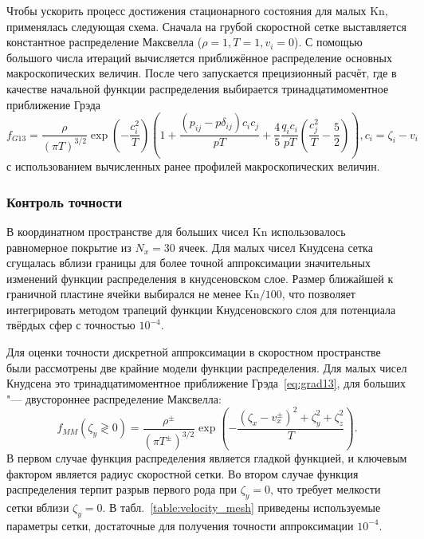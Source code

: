 \documentclass[a4paper,12pt]{article}
\newcommand{\Kn}{\mathrm{Kn}}
\begin{document}
Чтобы ускорить процесс достижения стационарного состояния для малых \(\Kn\), применялась следующая схема.
Сначала на грубой скоростной сетке выставляется константное распределение Максвелла (\(\rho=1,T=1,v_i=0\)).
С помощью большого числа итераций вычисляется приближённое распределение основных макроскопических величин.
После чего запускается прецизионный расчёт, где в качестве начальной функции распределения выбирается
тринадцатимоментное приближение Грэда~\cite{Grad1949}
\begin{equation}\label{eq:grad13}
    f_{G13} = \frac{\rho}{(\pi T)^{3/2}}\exp\left(-\frac{c_i^2}{ T}\right)
    \left( 1 + \frac{(p_{ij}-p\delta_{ij})c_ic_j}{pT} + \frac4{5}\frac{q_ic_i}{pT}\left(\frac{c_j^2}{T}-\frac5{2}\right) \right),
    c_i = \zeta_i - v_i
\end{equation}
с использованием вычисленных ранее профилей макроскопических величин.

\subsubsection{Контроль точности}

В координатном пространстве для больших чисел \(\Kn\) использовалось равномерное покрытие
из \(N_x = 30\) ячеек. Для малых чисел Кнудсена сетка сгущалась вблизи границы
для более точной аппроксимации значительных изменений функции распределения в кнудсеновском слое.
Размер ближайшей к граничной пластине ячейки выбирался не менее \(\Kn/100\),
что позволяет интегрировать методом трапеций функции Кнудсеновского слоя для потенциала твёрдых сфер
с точностью \(10^{-4}\).

Для оценки точности дискретной аппроксимации в скоростном пространстве были рассмотрены две крайние модели
функции распределения. Для малых чисел Кнудсена это тринадцатимоментное приближение Грэда~\eqref{eq:grad13},
для больших "--- двустороннее распределение Максвелла:
\begin{equation}\label{eq:double_Maxwell}
    f_{MM}(\zeta_y\gtrless0) = \frac{\rho^\pm}{(\pi T^\pm)^{3/2}}\exp\left(-\frac{(\zeta_x-v_x^\pm)^2+\zeta_y^2+\zeta_z^2}{T}\right).
\end{equation}
В первом случае функция распределения является гладкой функцией, и ключевым фактором является
радиус скоростной сетки. Во втором случае функция распределения терпит разрыв первого рода при \(\zeta_y=0\),
что требует мелкости сетки вблизи \(\zeta_y=0\).
В табл.~\ref{table:velocity_mesh} приведены используемые параметры сетки,
достаточные для получения точности аппроксимации \(10^{-4}\).
\end{document}
